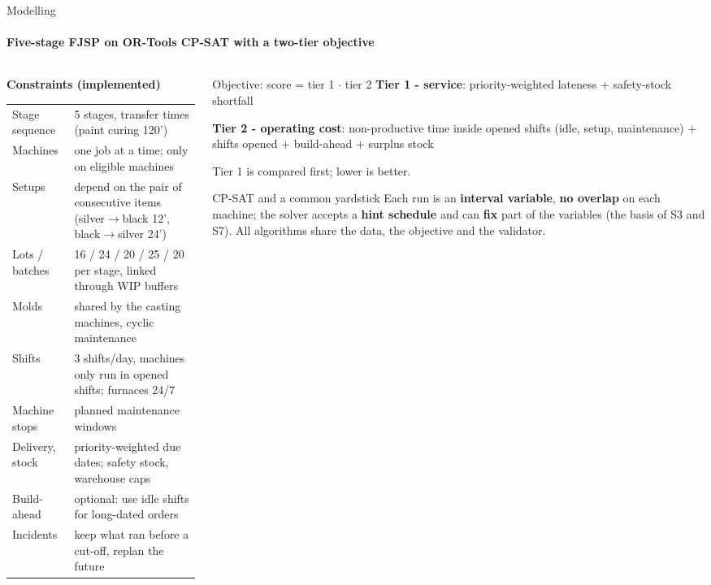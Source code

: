 \begin{frame}{Modelling}
\framesubtitle{Five-stage FJSP on OR-Tools CP-SAT with a two-tier objective}
\begin{columns}[T]
\begin{column}{0.58\textwidth}
\scriptsize
\textbf{Constraints (implemented)}\par\vspace{0.15em}
\begin{tabular}{@{}L{1.95cm}L{6.0cm}@{}}
\toprule
Stage sequence & 5 stages, transfer times (paint curing 120')\\
Machines & one job at a time; only on eligible machines\\
Setups & depend on the pair of consecutive items (silver$\to$black 12', black$\to$silver 24')\\
Lots / batches & 16 / 24 / 20 / 25 / 20 per stage, linked through WIP buffers\\
Molds & shared by the casting machines, cyclic maintenance\\
Shifts & 3 shifts/day, machines only run in opened shifts; furnaces 24/7\\
Machine stops & planned maintenance windows\\
Delivery, stock & priority-weighted due dates; safety stock, warehouse caps\\
Build-ahead & optional: use idle shifts for long-dated orders\\
Incidents & keep what ran before a cut-off, replan the future\\
\bottomrule
\end{tabular}
\end{column}
\begin{column}{0.39\textwidth}
\begin{block}{Objective: score = tier 1 $\cdot$ tier 2}
\scriptsize
\textbf{Tier 1 - service}: priority-weighted lateness + safety-stock shortfall\par\vspace{0.2em}
\textbf{Tier 2 - operating cost}: non-productive time inside opened shifts (idle, setup, maintenance)
+ shifts opened + build-ahead + surplus stock\par\vspace{0.2em}
Tier 1 is compared first; lower is better.
\end{block}
\vspace{-0.2em}
\begin{block}{CP-SAT and a common yardstick}
\scriptsize
Each run is an \textbf{interval variable}, \textbf{no overlap} on each machine; the solver accepts a
\textbf{hint schedule} and can \textbf{fix} part of the variables (the basis of S3 and S7).
All algorithms share the data, the objective and the validator.
\end{block}
\end{column}
\end{columns}
\end{frame}

